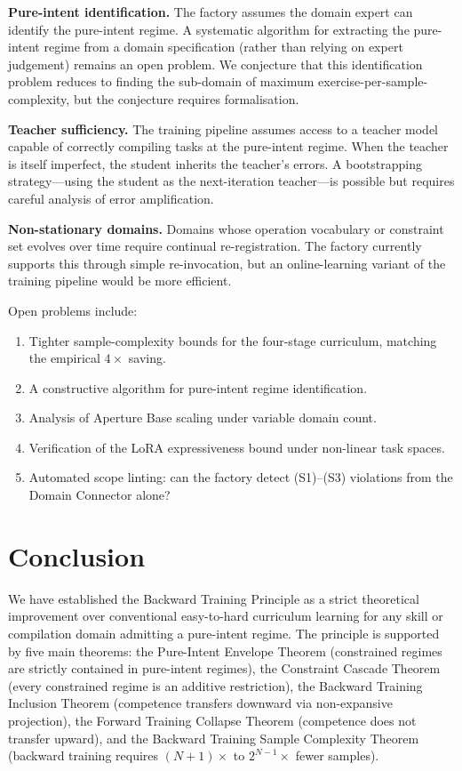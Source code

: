 \documentclass[twocolumn,11pt,a4paper]{article}
\begin{document}
\textbf{Pure-intent identification.} The factory assumes the domain expert can identify the pure-intent regime. A systematic algorithm for extracting the pure-intent regime from a domain specification (rather than relying on expert judgement) remains an open problem. We conjecture that this identification problem reduces to finding the sub-domain of maximum exercise-per-sample-complexity, but the conjecture requires formalisation.

\textbf{Teacher sufficiency.} The training pipeline assumes access to a teacher model capable of correctly compiling tasks at the pure-intent regime. When the teacher is itself imperfect, the student inherits the teacher's errors. A bootstrapping strategy---using the student as the next-iteration teacher---is possible but requires careful analysis of error amplification.

\textbf{Non-stationary domains.} Domains whose operation vocabulary or constraint set evolves over time require continual re-registration. The factory currently supports this through simple re-invocation, but an online-learning variant of the training pipeline would be more efficient.

Open problems include:
\begin{enumerate}[leftmargin=*,itemsep=1pt]
\item Tighter sample-complexity bounds for the four-stage curriculum, matching the empirical $4\times$ saving.
\item A constructive algorithm for pure-intent regime identification.
\item Analysis of Aperture Base scaling under variable domain count.
\item Verification of the LoRA expressiveness bound under non-linear task spaces.
\item Automated scope linting: can the factory detect (S1)--(S3) violations from the Domain Connector alone?
\end{enumerate}


\section{Conclusion}
\label{sec:conclusion}

We have established the Backward Training Principle as a strict theoretical improvement over conventional easy-to-hard curriculum learning for any skill or compilation domain admitting a pure-intent regime. The principle is supported by five main theorems: the Pure-Intent Envelope Theorem (constrained regimes are strictly contained in pure-intent regimes), the Constraint Cascade Theorem (every constrained regime is an additive restriction), the Backward Training Inclusion Theorem (competence transfers downward via non-expansive projection), the Forward Training Collapse Theorem (competence does not transfer upward), and the Backward Training Sample Complexity Theorem (backward training requires $(N+1)\times$ to $2^{N-1}\times$ fewer samples).
\end{document}
